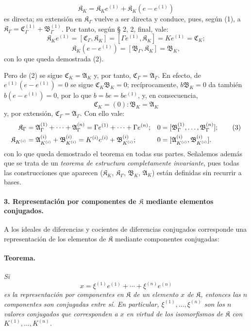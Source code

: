\[
\mathfrak K_K=\mathfrak K_K e^{(1)}+\mathfrak K_K(e-e^{(1)})
\]
es directa; su extensión en $\mathfrak K_\Gamma$ vuelve a ser directa y conduce, pues, según (1), a $\mathfrak K_\Gamma=\mathfrak C_\Gamma^{(1)}+\mathfrak B_\Gamma^{(1)}$. Por tanto, según § 2, 2, final, vale:
\[
\mathfrak K_K e^{(1)}=[\mathfrak C_\Gamma,\mathfrak K_K]
=[\Gamma e^{(1)},\mathfrak K_K]=Ke^{(1)}=\mathfrak C_K;
\]
\[
\mathfrak K_K(e-e^{(1)})=[\mathfrak B_\Gamma,\mathfrak K_K]=\mathfrak B_K,
\]
con lo que queda demostrada (2).

Pero de (2) se sigue $\mathfrak C_K=\mathfrak A_K$ y, por tanto, $\mathfrak C_\Gamma=\mathfrak A_\Gamma$. En efecto, de $e^{(1)}(e-e^{(1)})=0$ se sigue $\mathfrak C_K\mathfrak B_K=0$; recíprocamente, $b\mathfrak B_K=0$ da también $b(e-e^{(1)})=0$, por lo que $b=be=be^{(1)}$, y, en consecuencia,
\[
\mathfrak C_K=(0):\mathfrak B_K=\mathfrak A_K
\]
y, por extensión, $\mathfrak C_\Gamma=\mathfrak A_\Gamma$. Con ello vale:
\begin{align}
\mathfrak K_\Gamma
&=\mathfrak A_\Gamma^{(1)}+\cdots+\mathfrak A_\Gamma^{(n)}
=\Gamma e^{(1)}+\cdots+\Gamma e^{(n)};
&0&=[\mathfrak B_\Gamma^{(1)},\ldots,\mathfrak B_\Gamma^{(n)}]; \tag{3}\\
\mathfrak K_{K^{(i)}}
&=\mathfrak A_{K^{(i)}}^{(i)}+\mathfrak B_{K^{(i)}}^{(i)}
=K^{(i)}e^{(i)}+\mathfrak B_{K^{(i)}}^{(i)};
&0&=[\mathfrak A_{K^{(i)}}^{(i)},\mathfrak B_{K^{(i)}}^{(i)}].\notag
\end{align}
con lo que queda demostrado el teorema en todas sus partes. Señalemos además que se trata de un \emph{teorema de estructura completamente invariante}, pues todas las construcciones que aparecen ($\mathfrak K_K$, $\mathfrak K_\Gamma$, $\mathfrak B_K$, $\mathfrak A_K$) están definidas sin recurrir a bases.

\paragraph{3. Representación por componentes de $\mathfrak K$ mediante elementos conjugados.}
A los ideales de diferencias y cocientes de diferencias conjugados corresponde una representación de los elementos de $\mathfrak K$ mediante componentes conjugadas:

\paragraph{Teorema.}
\emph{Si
\[
x=\xi^{(1)}e^{(1)}+\cdots+\xi^{(n)}e^{(n)}
\]
es la representación por componentes en $\mathfrak K$ de un elemento $x$ de $\mathfrak K$, entonces las $n$ componentes son conjugadas entre sí. En particular, $\xi^{(1)},\ldots,\xi^{(n)}$ son los $n$ valores conjugados que corresponden a $x$ en virtud de los isomorfismos de $\mathfrak K$ con $K^{(1)},\ldots,K^{(n)}$.}

